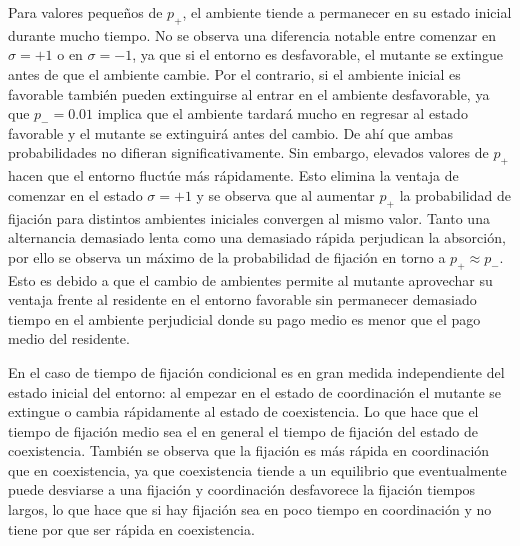 \documentclass[%
 sor,
 jor,
 amsmath,amssymb,
 reprint,%
]{revtex4-2}
\begin{document}
Para valores pequeños de $p_+$, el ambiente tiende a permanecer en su estado inicial durante mucho tiempo. No se observa una diferencia notable entre comenzar en $\sigma = +1$ o en $\sigma = -1$, ya que si el entorno es desfavorable, el mutante se extingue antes de que el ambiente cambie. Por el contrario, si el ambiente inicial es favorable también pueden extinguirse al entrar en el ambiente desfavorable, ya que $p_- = 0.01$ implica que el ambiente tardará mucho en regresar al estado favorable y el mutante se extinguirá antes del cambio. De ahí que ambas probabilidades no difieran significativamente.
Sin embargo, elevados valores de $p_+$ hacen que el entorno fluctúe más rápidamente. Esto elimina la ventaja de comenzar en el estado $\sigma = +1$ y se observa que al aumentar $p_+$ la probabilidad de fijación para distintos ambientes iniciales convergen al mismo valor.
Tanto una alternancia demasiado lenta como una demasiado rápida perjudican la absorción, por ello se observa un máximo de la probabilidad de fijación  en torno a $p_+ \approx p_-$. Esto es debido a que el cambio de ambientes permite al mutante aprovechar su ventaja frente al residente en el entorno favorable sin permanecer demasiado tiempo en el ambiente perjudicial donde su pago medio es menor que el pago medio del residente. 

En el caso de tiempo de fijación condicional es en gran medida independiente del estado inicial del entorno: al empezar en el estado de coordinación el mutante se extingue o cambia rápidamente al estado de coexistencia. Lo que hace que el tiempo de fijación medio sea el en general el tiempo de fijación del estado de coexistencia.
También se observa que la fijación es más rápida en coordinación que en coexistencia, ya que coexistencia tiende a un equilibrio que eventualmente puede desviarse a una fijación y coordinación desfavorece la fijación tiempos largos, lo que hace que si hay fijación sea en poco tiempo en coordinación y
no tiene por que ser rápida en coexistencia.
\end{document}
